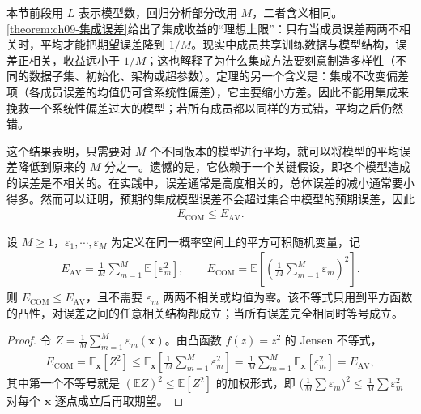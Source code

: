 \documentclass[../../main.tex]{subfiles}
\begin{document}
\begin{remark}本节前段用 $L$ 表示模型数，回归分析部分改用 $M$，二者含义相同。\cref{theorem:ch09-集成误差}给出了集成收益的“理想上限”：只有当成员误差两两不相关时，平均才能把期望误差降到 $1/M$。现实中成员共享训练数据与模型结构，误差正相关，收益远小于 $1/M$；这也解释了为什么集成方法要刻意制造多样性（不同的数据子集、初始化、架构或超参数）。定理的另一个含义是：集成不改变偏差项（各成员误差的均值仍可含系统性偏差），它主要缩小方差。因此不能用集成来挽救一个系统性偏差过大的模型；若所有成员都以同样的方式错，平均之后仍然错。
\end{remark}

这个结果表明，只需要对 $M$ 个不同版本的模型进行平均，就可以将模型的平均误差降低到原来的 $M$ 分之一。遗憾的是，它依赖于一个关键假设，即各个模型造成的误差是不相关的。在实践中，误差通常是高度相关的，总体误差的减小通常要小得多。然而可以证明，预期的集成模型误差不会超过集合中模型的预期误差，因此
\begin{align*}
E_{\mathrm{COM}}\leqslant E_{\mathrm{AV}}.
\end{align*}

\begin{proposition}\label{proposition:ch09-集成上界}
设 $M\geqslant1$，$\varepsilon_{1},\cdots,\varepsilon_{M}$ 为定义在同一概率空间上的平方可积随机变量，记
\begin{align*}
E_{\mathrm{AV}}=\frac{1}{M}\sum_{m=1}^{M}\mathbb{E}[\varepsilon_{m}^{2}],\qquad
E_{\mathrm{COM}}=\mathbb{E}\left[\left(\frac{1}{M}\sum_{m=1}^{M}\varepsilon_{m}\right)^{2}\right].
\end{align*}
则 $E_{\mathrm{COM}}\leqslant E_{\mathrm{AV}}$，且不需要 $\varepsilon_{m}$ 两两不相关或均值为零。该不等式只用到平方函数的凸性，对误差之间的任意相关结构都成立；当所有误差完全相同时等号成立。
\end{proposition}

\begin{proof}
令 $Z=\frac{1}{M}\sum_{m=1}^{M}\varepsilon_{m}(\boldsymbol{x})$。由凸函数 $f(z)=z^{2}$ 的 Jensen 不等式，
\begin{align*}
E_{\mathrm{COM}}=\mathbb{E}_{\boldsymbol{x}}[Z^{2}]\leqslant\mathbb{E}_{\boldsymbol{x}}\!\left[\frac{1}{M}\sum_{m=1}^{M}\varepsilon_{m}^{2}\right]=\frac{1}{M}\sum_{m=1}^{M}\mathbb{E}_{\boldsymbol{x}}[\varepsilon_{m}^{2}]=E_{\mathrm{AV}},
\end{align*}
其中第一个不等号就是 $(\mathbb{E}Z)^{2}\leqslant\mathbb{E}[Z^{2}]$ 的加权形式，即 $\bigl(\frac{1}{M}\sum\varepsilon_{m}\bigr)^{2}\leqslant\frac{1}{M}\sum\varepsilon_{m}^{2}$ 对每个 $\boldsymbol{x}$ 逐点成立后再取期望。
\end{proof}
\end{document}
